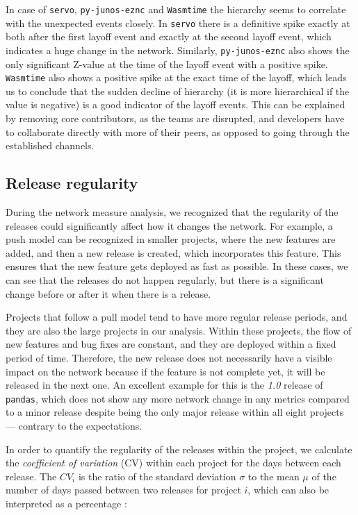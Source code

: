 In case of \texttt{servo}, \texttt{py-junos-eznc} and \texttt{Wasmtime} the hierarchy seems to correlate with the unexpected events closely. In \texttt{servo} there is a definitive spike exactly at both after the first layoff event and exactly at the second layoff event, which indicates a huge change in the network. Similarly, \texttt{py-junos-eznc} also shows the only significant Z-value at the time of the layoff event with a positive spike. \texttt{Wasmtime} also shows a positive spike at the exact time of the layoff, which leads us to conclude that the sudden decline of hierarchy (it is more hierarchical if the value is negative) is a good indicator of the layoff events. This can be explained by removing core contributors, as the teams are disrupted, and developers have to collaborate directly with more of their peers, as opposed to going through the established channels.

\subsection{Release regularity}
\label{sec:release_reg}

During the network measure analysis, we recognized that the regularity of the releases could significantly affect how it changes the network. For example, a push model can be recognized in smaller projects, where the new features are added, and then a new release is created, which incorporates this feature. This ensures that the new feature gets deployed as fast as possible. In these cases, we can see that the releases do not happen regularly, but there is a significant change before or after it when there is a release.

Projects that follow a pull model tend to have more regular release periods, and they are also the large projects in our analysis. Within these projects, the flow of new features and bug fixes are constant, and they are deployed within a fixed period of time. Therefore, the new release does not necessarily have a visible impact on the network because if the feature is not complete yet, it will be released in the next one. An excellent example for this is the \textit{1.0} release of \texttt{pandas}, which does not show any more network change in any metrics compared to a minor release despite being the only major release within all eight projects — contrary to the expectations.

In order to quantify the regularity of the releases within the project, we calculate the \textit{coefficient of variation} (CV) within each project for the days between each release. The $CV_i$ is the ratio of the standard deviation $\sigma$ to the mean $\mu$ of the number of days passed between two releases for project $i$, which can also be interpreted as a percentage \cite{everittCambridgeDictionaryStatistics1998a}:

